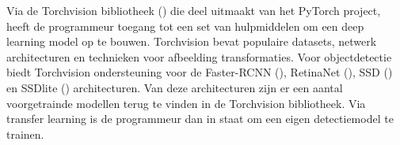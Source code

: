 Via de Torchvision bibliotheek (\cite{Facebook_PyTorch_2017}) die deel uitmaakt van het PyTorch project, heeft de programmeur toegang tot een set van hulpmiddelen om een deep learning model op te bouwen.
Torchvision bevat populaire datasets, netwerk architecturen en technieken voor afbeelding transformaties.
Voor objectdetectie biedt Torchvision ondersteuning voor de Faster-RCNN (\cite{ren_faster_2016}), RetinaNet (\cite{lin_focal_2018}), SSD (\cite{liu_ssd_2016}) en SSDlite (\cite{sandler_mobilenetv2_2019}) architecturen.
Van deze architecturen zijn er een aantal voorgetrainde modellen terug te vinden in de Torchvision bibliotheek.
Via transfer learning is de programmeur dan in staat om een eigen detectiemodel te trainen.




